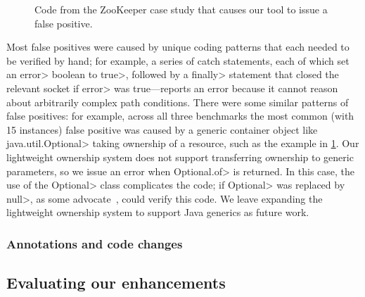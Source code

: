 \begin{figure}
  
  \caption{Code from the ZooKeeper case study that causes our tool
  to issue a false positive.}
  \label{fig:zookeeper-optional}
\end{figure}

Most false positives were caused by unique coding patterns that
each needed to be verified by hand; for example, a series of catch
statements, each of which set an \<error> boolean to \<true>, followed
by a \<finally> statement that closed the relevant socket if \<error>
was true---\Tool reports an error because it cannot reason about arbitrarily
complex path conditions. There were some similar patterns of false positives:
for example, across all three benchmarks the most common (with 15 instances) false
positive was caused by
a generic container object like \<java.util.Optional> taking ownership of a resource, such
as the example in \cref{fig:zookeeper-optional}. Our lightweight ownership
system does not support transferring ownership to generic parameters,
so we issue an error when \<Optional.of> is returned. In this case, the use
of the \<Optional> class complicates the code; if \<Optional> was replaced
by \<null>, as some advocate~\cite{ErnstNothingIsBetterThanOptional},
\Tool could verify this code. We leave expanding the lightweight ownership system to
support Java generics as future work.

\subsubsection{Annotations and code changes}
\label{sec:anno-burden}


\subsection{Evaluating our enhancements}
\label{sec:ablation}

\newcommand{\abltablerow}[4]{\textbf{\smaller{#1}} & #2 & #3 & #4}

